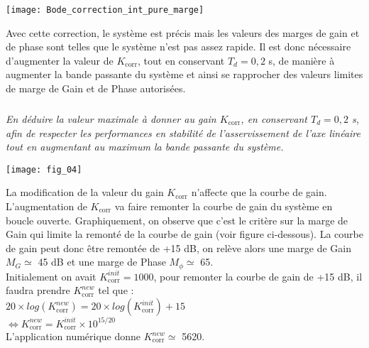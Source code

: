 \begin{multicols}{2}
\begin{corrige}
 
\begin{center}
      \texttt{[image: Bode\_correction\_int\_pure\_marge]}
\end{center}
\end{corrige}
\fi

\ifprof
\else
Avec cette correction, le système est précis mais les valeurs des marges de gain et de phase sont telles que le système n'est pas assez rapide. Il est donc nécessaire d'augmenter la valeur de $K_{\text{corr}}$, tout en conservant $T_d = 0,2$ s, de manière à augmenter la bande passante du système et ainsi se rapprocher des valeurs limites de marge de Gain et de Phase autorisées.
\fi

\subparagraph{}\textit{En déduire la valeur maximale à donner au gain $K_{\text{corr}}$, en conservant $T_d = 0,2$ s, afin de respecter les performances en stabilité de l'asservissement de l'axe linéaire tout en augmentant au maximum la bande passante du système. }


\begin{center}
\texttt{[image: fig\_04]}
\end{center}

\ifprof
\begin{corrige}
La modification de la valeur du gain $K_{\text{corr}}$ n'affecte que la courbe de gain. L'augmentation de $K_{\text{corr}}$ va faire remonter la courbe de gain du système en boucle ouverte. Graphiquement, on observe que c'est le critère sur la marge de Gain qui limite la remonté de la courbe de gain (voir figure ci-dessous). La courbe de gain peut donc être remontée de +15 dB, on relève alors une marge de Gain $M_G \simeq$ 45 dB et une marge de Phase $M_{\phi} \simeq$ 65\degre. \\
Initialement on avait $K_{\text{corr}}^{init} = 1000$, pour remonter la courbe de gain de +15 dB, il faudra prendre $K_{\text{corr}}^{new}$ tel que : \\
$20 \times log(K_{\text{corr}}^{new}) = 20 \times log(K_{\text{corr}}^{init}) + 15$\\
$\Leftrightarrow K_{\text{corr}}^{new} = K_{\text{corr}}^{init} \times 10^{15/20}$\\
L'application numérique donne $K_{\text{corr}}^{new} \simeq$ 5620. 
 

\end{corrige}
\end{multicols}
